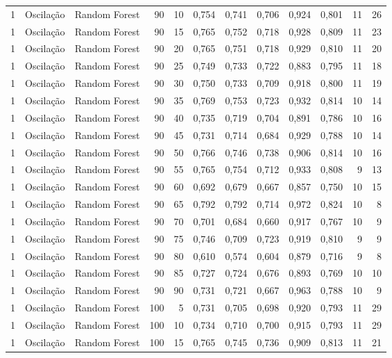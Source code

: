 \begin{longtable}{@{}rllrrrrrrrrr@{}}
1 & Oscilação & Random Forest & 90 & 10 & 0,754 & 0,741 & 0,706 & 0,924 & 0,801 & 11 & 26 \\
1 & Oscilação & Random Forest & 90 & 15 & 0,765 & 0,752 & 0,718 & 0,928 & 0,809 & 11 & 23 \\
1 & Oscilação & Random Forest & 90 & 20 & 0,765 & 0,751 & 0,718 & 0,929 & 0,810 & 11 & 20 \\
1 & Oscilação & Random Forest & 90 & 25 & 0,749 & 0,733 & 0,722 & 0,883 & 0,795 & 11 & 18 \\
1 & Oscilação & Random Forest & 90 & 30 & 0,750 & 0,733 & 0,709 & 0,918 & 0,800 & 11 & 19 \\
1 & Oscilação & Random Forest & 90 & 35 & 0,769 & 0,753 & 0,723 & 0,932 & 0,814 & 10 & 14 \\
1 & Oscilação & Random Forest & 90 & 40 & 0,735 & 0,719 & 0,704 & 0,891 & 0,786 & 10 & 16 \\
1 & Oscilação & Random Forest & 90 & 45 & 0,731 & 0,714 & 0,684 & 0,929 & 0,788 & 10 & 14 \\
1 & Oscilação & Random Forest & 90 & 50 & 0,766 & 0,746 & 0,738 & 0,906 & 0,814 & 10 & 16 \\
1 & Oscilação & Random Forest & 90 & 55 & 0,765 & 0,754 & 0,712 & 0,933 & 0,808 & 9 & 13 \\
1 & Oscilação & Random Forest & 90 & 60 & 0,692 & 0,679 & 0,667 & 0,857 & 0,750 & 10 & 15 \\
1 & Oscilação & Random Forest & 90 & 65 & 0,792 & 0,792 & 0,714 & 0,972 & 0,824 & 10 & 8 \\
1 & Oscilação & Random Forest & 90 & 70 & 0,701 & 0,684 & 0,660 & 0,917 & 0,767 & 10 & 9 \\
1 & Oscilação & Random Forest & 90 & 75 & 0,746 & 0,709 & 0,723 & 0,919 & 0,810 & 9 & 9 \\
1 & Oscilação & Random Forest & 90 & 80 & 0,610 & 0,574 & 0,604 & 0,879 & 0,716 & 9 & 8 \\
1 & Oscilação & Random Forest & 90 & 85 & 0,727 & 0,724 & 0,676 & 0,893 & 0,769 & 10 & 10 \\
1 & Oscilação & Random Forest & 90 & 90 & 0,731 & 0,721 & 0,667 & 0,963 & 0,788 & 10 & 9 \\
1 & Oscilação & Random Forest & 100 & 5 & 0,731 & 0,705 & 0,698 & 0,920 & 0,793 & 11 & 29 \\
1 & Oscilação & Random Forest & 100 & 10 & 0,734 & 0,710 & 0,700 & 0,915 & 0,793 & 11 & 29 \\
1 & Oscilação & Random Forest & 100 & 15 & 0,765 & 0,745 & 0,736 & 0,909 & 0,813 & 11 & 21 \\

\end{longtable}
